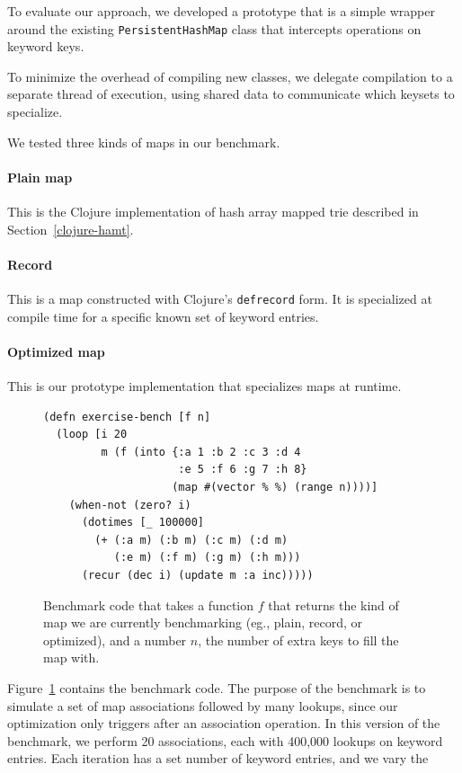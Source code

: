 \documentclass[preprint]{sigplanconf}
\begin{document}
To evaluate our approach, we developed a prototype
that is a simple wrapper around the existing \texttt{PersistentHashMap}
class that intercepts operations on keyword keys.

To minimize the overhead of compiling new classes, we
delegate compilation to a separate thread of execution,
using shared data to communicate which keysets to 
specialize.

We tested three kinds of maps in our benchmark.

\paragraph{Plain map}
This is the Clojure implementation of hash array mapped trie
described in Section~\ref{clojure-hamt}.

\paragraph{Record}
This is a map constructed with Clojure's \texttt{defrecord}
form. It is specialized at compile time for a specific
known set of keyword entries.

\paragraph{Optimized map}
This is our prototype implementation that specializes
maps at runtime.

\begin{figure}
\begin{verbatim}
(defn exercise-bench [f n]
  (loop [i 20
         m (f (into {:a 1 :b 2 :c 3 :d 4
                     :e 5 :f 6 :g 7 :h 8}
                    (map #(vector % %) (range n))))]
    (when-not (zero? i)
      (dotimes [_ 100000] 
        (+ (:a m) (:b m) (:c m) (:d m)
           (:e m) (:f m) (:g m) (:h m)))
      (recur (dec i) (update m :a inc)))))
\end{verbatim}
\caption{Benchmark code that takes a function $f$
that returns the kind of map we are currently
benchmarking (eg., plain, record, or optimized),
and a number $n$, the number of extra keys to fill
the map with.
}
\label{benchmark-code}
\end{figure}

Figure~\ref{benchmark-code} contains the benchmark
code. The purpose of the benchmark is to simulate
a set of map associations followed by many lookups,
since our optimization only triggers after an association
operation.
In this version of the benchmark, we perform 20
associations, each with 400,000 lookups
on keyword entries.
Each iteration has a set number of keyword entries,
and we vary the 
\end{document}
